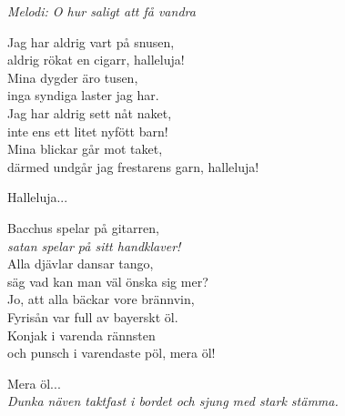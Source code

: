{\footnotesize\textit{Melodi: O hur saligt att få vandra}}\par
\vspace{10pt}
Jag har aldrig vart på snusen,\\
aldrig rökat en cigarr, halleluja!\\
Mina dygder äro tusen,\\
inga syndiga laster jag har.\\
Jag har aldrig sett nåt naket,\\
inte ens ett litet nyfött barn!\\
Mina blickar går mot taket,\\
därmed undgår jag frestarens garn, halleluja!\par
\vspace{10pt}
Halleluja...\par
\vspace{10pt}
Bacchus spelar på gitarren,\\
\textit{satan spelar på sitt handklaver!}\\
Alla djävlar dansar tango,\\
säg vad kan man väl önska sig mer?\\
Jo, att alla bäckar vore brännvin,\\
Fyrisån var full av bayerskt öl.\\
Konjak i varenda rännsten\\
och punsch i varendaste pöl, mera öl!\par
\vspace{10pt}
Mera öl...\\

{\footnotesize\textit{Dunka näven taktfast i bordet och sjung med stark stämma.}}
